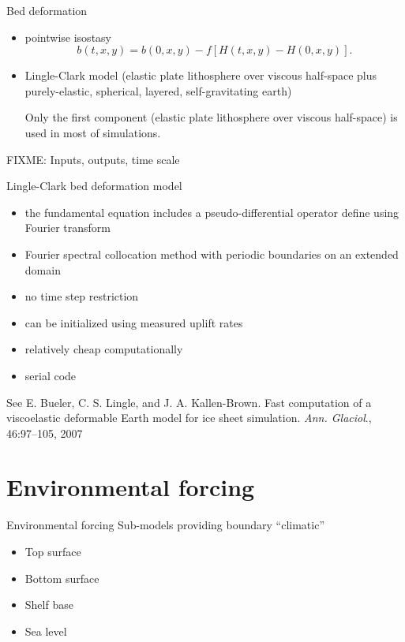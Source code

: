 \documentclass[hide notes,intlimits]{beamer}
\begin{document}
\begin{frame}{Bed deformation}
  \begin{itemize}
  \item pointwise isostasy
    \begin{equation}
      \label{eq:9}
      b(t,x,y) = b(0,x,y) - f \left[H(t,x,y) - H(0,x,y)\right].
    \end{equation}
  \item Lingle-Clark model (elastic plate lithosphere over viscous
    half-space plus purely-elastic, spherical, layered,
    self-gravitating earth)

    \medskip
    Only the first component (elastic plate lithosphere over viscous
    half-space) is used in most of simulations.
  \end{itemize}

  FIXME: Inputs, outputs, time scale
\end{frame}

\begin{frame}{Lingle-Clark bed deformation model}
  \begin{itemize}
  \item the fundamental equation includes a pseudo-differential
    operator define using Fourier transform
  \item Fourier spectral collocation method with periodic boundaries
    on an extended domain
  \item no time step restriction
  \item can be initialized using measured uplift rates
  \item relatively cheap computationally
  \item serial code
  \end{itemize}

  See E. Bueler, C. S. Lingle, and J. A. Kallen-Brown. Fast
  computation of a viscoelastic deformable Earth model for ice sheet
  simulation. \emph{Ann. Glaciol}., 46:97–105, 2007
\end{frame}

\section{Environmental forcing}
\label{sec:environment}

\begin{frame}{Environmental forcing}
  Sub-models providing boundary ``climatic''

  \begin{itemize}
  \item Top surface
  \item Bottom surface
  \item Shelf base
  \item Sea level
  \end{itemize}
\end{frame}
\end{document}
